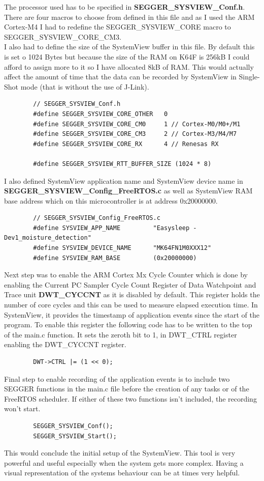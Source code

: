 \documentclass[12pt,a4paper]{article}
\begin{document}
		The processor used has to be specified in {\bfseries SEGGER\_SYSVIEW\_Conf.h}. There are four macros to choose from defined in this file and as I used the ARM Cortex-M4 I had to redefine the SEGGER\_SYSVIEW\_CORE macro to SEGGER\_SYSVIEW\_CORE\_CM3.\\ 	
        I also had to define the size of the SystemView buffer in this file. By default this is set o 1024 Bytes but because the size of the RAM on K64F is 256kB I could afford to assign more to it so I have allocated 8kB of RAM. This would actually affect the amount of time that the data can be recorded by SystemView in Single-Shot mode (that is without the use of J-Link).
		\begin{lstlisting}
        // SEGGER_SYSVIEW_Conf.h
        #define SEGGER_SYSVIEW_CORE_OTHER   0 
        #define SEGGER_SYSVIEW_CORE_CM0     1 // Cortex-M0/M0+/M1
        #define SEGGER_SYSVIEW_CORE_CM3     2 // Cortex-M3/M4/M7
        #define SEGGER_SYSVIEW_CORE_RX      4 // Renesas RX
    
        #define SEGGER_SYSVIEW_RTT_BUFFER_SIZE (1024 * 8)
		\end{lstlisting}
		I also defined SystemView application name and SystemView device name in {\bfseries SEGGER\_SYSVIEW\_Config\_FreeRTOS.c} as well as SystemView RAM base address which on this microcontroller is at address 0x20000000.
		\begin{lstlisting}
        // SEGGER_SYSVIEW_Config_FreeRTOS.c
        #define SYSVIEW_APP_NAME         "Easysleep - Dev1_moisture_detection"
        #define SYSVIEW_DEVICE_NAME      "MK64FN1M0XXX12"
        #define SYSVIEW_RAM_BASE         (0x20000000)
		\end{lstlisting}
        Next step was to enable the ARM Cortex Mx Cycle Counter which is done by enabling the Current PC Sampler Cycle Count Register of Data Watchpoint and Trace unit {\bfseries DWT\_CYCCNT} as it is disabled by default. This register holds the number of core cycles and this can be used to measure elapsed execution time. In SystemView, it provides the timestamp of application events since the start of the program.
        To enable this register the following code has to be written to the top of the main.c function. It sets the zeroth bit to 1, in DWT\_CTRL register enabling the DWT\_CYCCNT register.
        \begin{lstlisting}
        DWT->CTRL |= (1 << 0);
        \end{lstlisting}
        Final step to enable recording of the application events is to include two SEGGER functions in the main.c file before the creation of any tasks or of the FreeRTOS scheduler. If either of these two functions isn't included, the recording won't start.
        \begin{lstlisting}
        SEGGER_SYSVIEW_Conf();
        SEGGER_SYSVIEW_Start();
        \end{lstlisting}
        This would conclude the initial setup of the SystemView. This tool is very powerful and useful especially when the system gets more complex. Having a visual representation of the systems behaviour can be at times very helpful.
        
\end{document}
